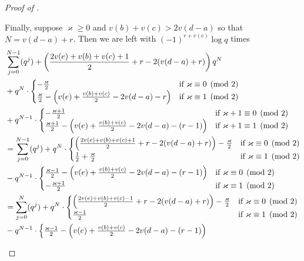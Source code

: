 \begin{proof}[Proof of ]
\begin{itemize}
\ii Finally, suppose $\varkappa \ge 0$ and $v(b) + v(c) > 2v(d-a)$
so that $N = v(d-a) + r$.
Then we are left with $(-1)^{r+v(c)} \log q$ times
\begin{align*}
  & \sum_{j=0}^{N-1} (q^j) + \left( \frac{2v(e)+v(b)+v(c)+1}{2} + r - 2(v(d-a)+r) \right) q^N \\
  & + q^{N} \cdot
  \begin{cases}
    -\frac{\varkappa}{2} & \text{if }\varkappa \equiv 0 \pmod 2 \\
    \frac{\varkappa}{2} - \left( v(e)+\frac{v(b)+v(c)}{2}-2v(d-a)-r \right)
    & \text{if }\varkappa \equiv 1 \pmod 2 \\
  \end{cases} \\
  & + q^{N-1} \cdot
  \begin{cases}
    -\frac{\varkappa+1}{2} & \text{if }\varkappa+1 \equiv 0 \pmod 2 \\
    \frac{\varkappa+1}{2} - \left( v(e)+\frac{v(b)+v(c)}{2}-2v(d-a)-(r-1) \right)
    & \text{if }\varkappa+1 \equiv 1 \pmod 2
  \end{cases} \\
  &= \sum_{j=0}^{N-1} (q^j)
   + q^{N} \cdot
  \begin{cases}
    \left( \frac{2v(e)+v(b)+v(c)+1}{2} + r - 2(v(d-a)+r) \right) -\frac{\varkappa}{2} & \text{if }\varkappa \equiv 0 \pmod 2 \\
    \frac{1}{2} + \frac{\varkappa}{2} & \text{if }\varkappa \equiv 1 \pmod 2
  \end{cases} \\
  & - q^{N-1} \cdot
  \begin{cases}
    \frac{\varkappa-1}{2} - \left( v(e)+\frac{v(b)+v(c)}{2}-2v(d-a)-(r-1) \right)
    & \text{if }\varkappa \equiv 0 \pmod 2 \\
    -\frac{\varkappa+1}{2} & \text{if }\varkappa \equiv 1 \pmod 2
  \end{cases} \\
  &= \sum_{j=0}^{N} (q^j)
   + q^{N} \cdot
  \begin{cases}
    \left( \frac{2v(e)+v(b)+v(c)-1}{2} + r - 2(v(d-a)+r) \right) -\frac{\varkappa}{2} & \text{if }\varkappa \equiv 0 \pmod 2 \\
    \frac{\varkappa-1}{2} & \text{if }\varkappa \equiv 1 \pmod 2
  \end{cases} \\
  & - q^{N-1} \cdot
  \begin{cases}
    \frac{\varkappa-1}{2} - \left( v(e)+\frac{v(b)+v(c)}{2}-2v(d-a)-(r-1) \right)

\end{cases}
\end{align*}
\end{itemize}
\end{proof}
